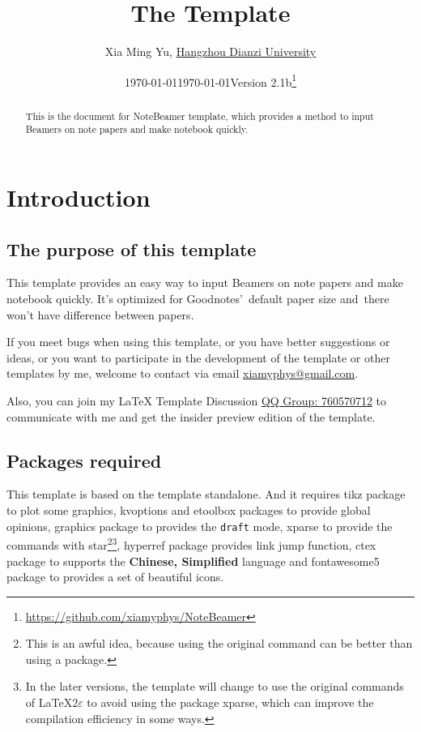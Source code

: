 \documentclass[11pt]{article}
\title{The \pkg{NoteBeamer} Template}
\author[1]{Xia Ming Yu, \href{https://www.hdu.edu.cn}{Hangzhou Dianzi University}}
\date{\today}
\affil[1]{\href{mailto:xiamyphys@gmail.com}{\texttt{xiamyphys@gmail.com}}}
\date{\today\quad Version 2.1b\thanks{%
  \url{https://github.com/xiamyphys/NoteBeamer}}}
\makeatletter
\def\@pkg#1{\texorpdfstring{\href{https://www.ctan.org/pkg/#1}%
{\textcolor{pkgcolor}{\textsf{#1}}}}{“#1”}}
\def\s@pkg#1{\texorpdfstring{\textcolor{pkgcolor}{\textsf{#1}}}{“#1”}}
\DeclareRobustCommand\pkg{\@ifstar\s@pkg\@pkg}
\makeatother
\begin{document}
\maketitle

\begin{abstract}
This is the document for \pkg{NoteBeamer} template, which provides a method to input Beamers on note papers and make notebook quickly.

\end{abstract}

\tableofcontents

\section{Introduction}

\subsection{The purpose of this template}
This template provides an easy way to input Beamers on note papers and make notebook quickly. It's optimized for Goodnotes' default paper size and there won't have difference between papers.

If you meet bugs when using this template, or you have better suggestions or ideas, or you want to participate in the development of the template or other templates by me, welcome to contact via email \href{mailto:xiamyphys@gmail.com}{xiamyphys@gmail.com}.

Also, you can join my \textsf\LaTeX{} Template Discussion \href{https://qm.qq.com/q/OnHzbNvVAG}{QQ Group: 760570712} to communicate with me and get the insider preview edition of the template.

\subsection{Packages required}
This template is based on the template \pkg{standalone}. And it requires \pkg{tikz} package to plot some graphics, \pkg{kvoptions} and \pkg{etoolbox} packages to provide global opinions, \pkg{graphics} package to provides the \verb|draft| mode, \pkg{xparse} to provide the commands with star\footnote{This is an awful idea, because using the original command can be better than using a package.}\footnote{In the later versions, the template will change to use the original commands of \textsf\LaTeX{$2\varepsilon$} to avoid using the package \pkg{xparse}, which can improve the compilation efficiency in some ways.}, \pkg{hyperref} package provides link jump function, \pkg{ctex} package to supports the \textbf{Chinese, Simplified} language and \pkg{fontawesome5} package to provides a set of beautiful icons.
\end{document}

